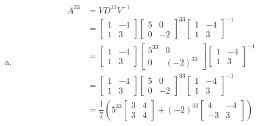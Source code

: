 \documentclass[12pt]{article}
\begin{document}
\begin{enumerate}[(a)]
	\item 
		\begin{align*}
			A^{33} &= VD^{33}V^{-1}\\
			&= 
				\begin{bmatrix}
					1 & -4\\
					1 & 3
				\end{bmatrix}
				\begin{bmatrix}
					5 & 0\\
					0 & -2
				\end{bmatrix}^{33}
				\begin{bmatrix}
					1 & -4\\
					1 & 3
				\end{bmatrix}^{-1}\\
			&= 
				\begin{bmatrix}
					1 & -4\\
					1 & 3
				\end{bmatrix}
				\begin{bmatrix}
					5^{33} & 0\\
					0 & (-2)^{33}
				\end{bmatrix}
				\begin{bmatrix}
					1 & -4\\
					1 & 3
				\end{bmatrix}^{-1}\\
			&= 
				\begin{bmatrix}
					1 & -4\\
					1 & 3
				\end{bmatrix}
				\begin{bmatrix}
					5 & 0\\
					0 & -2
				\end{bmatrix}^{33}
				\begin{bmatrix}
					1 & -4\\
					1 & 3
				\end{bmatrix}^{-1}\\
			&= 
				\dfrac{1}{7} \left( 5^{33}
				\begin{bmatrix}
					3 & 4\\
					3 & 4
				\end{bmatrix}
				+ (-2)^{33}
				\begin{bmatrix}
					4 & -4\\
					-3 & 3
				\end{bmatrix}
				\right)
		\end{align*}
\end{enumerate}
\newpage
\end{document}
